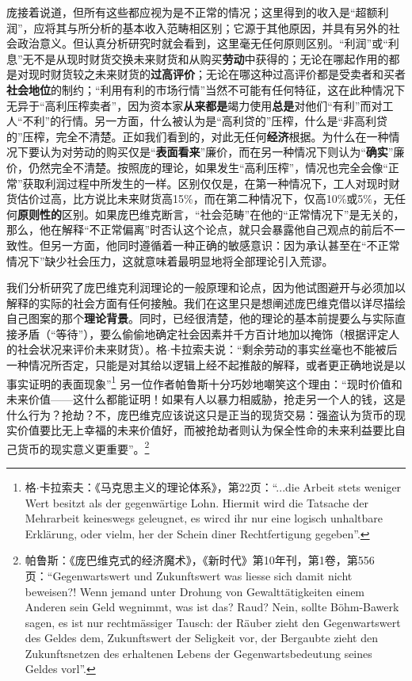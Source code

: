 \documentclass[fontset=fandol, a4paper, 12pt, openright]{ctexbook}
\begin{document}
庞接着说道，但所有这些都应视为是不正常的情况；这里得到的收入是“超额利润”，应将其与所分析的基本收入范畴相区别；它源于其他原因，并具有另外的社会政治意义。但认真分析研究时就会看到，这里毫无任何原则区别。“利润”或“利息”无不是从现时财货交换未来财货和从购买\textbf{劳动}中获得的；无论在哪起作用的都是对现时财货较之未来财货的\textbf{过高评价}；无论在哪这种过高评价都是受卖者和买者\textbf{社会地位}的制约；“利用有利的市场行情”当然不可能有任何特征，这在此种情况下无异于“高利压榨卖者”，因为资本家\textbf{从来都是}竭力使用\textbf{总是}对他们“有利”而对工人“不利”的行情。另一方面，什么被认为是“高利贷的”压榨，什么是“非高利贷的”压榨，完全不清楚。正如我们看到的，对此无任何\textbf{经济}根据。为什么在一种情况下要认为对劳动的购买仅是“\textbf{表面看来}”廉价，而在另一种情况下则认为“\textbf{确实}”廉价，仍然完全不清楚。按照庞的理论，如果发生“高利压榨”，情况也完全会像“正常”获取利润过程中所发生的一样。区别仅仅是，在第一种情况下，工人对现时财货估价过高，比方说比未来财货高15\%，而在第二种情况下，仅高10\%或5\%，无任何\textbf{原则性的}区别。如果庞巴维克断言，“社会范畴”在他的“正常情况下”是无关的，那么，他在解释“不正常偏离”时否认这个论点，就只会暴露他自己观点的前后不一致性。但另一方面，他同时遵循着一种正确的敏感意识：因为承认甚至在“不正常情况下”缺少社会压力，这就意味着最明显地将全部理论引入荒谬。

我们分析研究了庞巴维克利润理论的一般原理和论点，因为他试图避开与必须加以解释的实际的社会方面有任何接触。我们在这里只是想阐述庞巴维克借以详尽描绘自己图案的那个\textbf{理论背景}。同时，已经很清楚，他的理论的基本前提要么与实际直接矛盾（“等待”），要么偷偷地确定社会因素并千方百计地加以掩饰（根据评定人的社会状况来评价未来财货）。格$\cdot$卡拉索夫说：“剩余劳动的事实丝毫也不能被后一种情况所否定，只能是对其给以逻辑上经不起推敲的解释，或者更正确地说是以事实证明的表面现象”\footnote{格$\cdot$卡拉索夫：《马克思主义的理论体系》，第22页：“...die Arbeit stets weniger Wert besitzt als der gegenw\"{a}rtige Lohn. Hiermit wird die Tatsache der Mehrarbeit keineswegs geleugnet, es wircd ihr nur eine logisch unhaltbare Erkl\"{a}rung, oder vielm, her der Schein diner Rechtfertigung gegeben”.} 另一位作者帕鲁斯十分巧妙地嘲笑这个理由：“现时价值和未来价值——这什么都能证明！如果有人以暴力相威胁，抢走另一个人的钱，这是什么行为？抢劫？不，庞巴维克应该说这只是正当的现货交易：强盗认为货币的现实价值要比无上幸福的未来价值好，而被抢劫者则认为保全性命的未来利益要比自己货币的现实意义更重要”。\footnote{帕鲁斯：《庞巴维克式的经济魔术》，《新时代》第10年刊，第1卷，第556页：“Gegenwartswert und Zukunftswert was liesse sich damit nicht beweisen?! Wenn jemand unter Drohung von Gewaltt\"{a}tigkeiten einem Anderen sein Geld wegnimmt, was ist das? Raud? Nein, sollte B\"{o}hm-Bawerk sagen, es ist nur rechtm\"{a}ssiger Tausch: der R\"{a}uber zieht den Gegenwartswert des Geldes dem, Zukunftswert der Seligkeit vor, der Bergaubte zieht den Zukunftsnetzen des erhaltenen Lebens der Gegenwartsbedeutung seines Geldes vorl”.}
\end{document}
